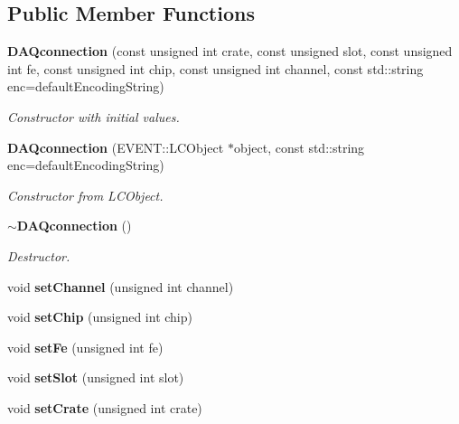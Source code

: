 \subsection*{Public Member Functions}
\begin{DoxyCompactItemize}
\item 
{\bf D\-A\-Qconnection} (const unsigned int crate, const unsigned slot, const unsigned int fe, const unsigned int chip, const unsigned int channel, const std\-::string enc=default\-Encoding\-String)\label{classCALICE_1_1DAQconnection_a1683f388c10013e8c435262de9c2b0a7}

\begin{DoxyCompactList}\small\item\em Constructor with initial values. \end{DoxyCompactList}\item 
{\bf D\-A\-Qconnection} (E\-V\-E\-N\-T\-::\-L\-C\-Object $\ast$object, const std\-::string enc=default\-Encoding\-String)\label{classCALICE_1_1DAQconnection_a7f6a1f3e76fe54b0f952cccf01b2b489}

\begin{DoxyCompactList}\small\item\em Constructor from L\-C\-Object. \end{DoxyCompactList}\item 
{\bf $\sim$\-D\-A\-Qconnection} ()\label{classCALICE_1_1DAQconnection_aab804c279b14b7139378825152f5d7af}

\begin{DoxyCompactList}\small\item\em Destructor. \end{DoxyCompactList}\item 
void {\bfseries set\-Channel} (unsigned int channel)\label{classCALICE_1_1DAQconnection_abc3d2a36439898873d04493ade4e2b79}

\item 
void {\bfseries set\-Chip} (unsigned int chip)\label{classCALICE_1_1DAQconnection_aa8749c6e343d3703cfd036a8a19851c8}

\item 
void {\bfseries set\-Fe} (unsigned int fe)\label{classCALICE_1_1DAQconnection_abbdb39c30e0d4c1709dc016fabbefabf}

\item 
void {\bfseries set\-Slot} (unsigned int slot)\label{classCALICE_1_1DAQconnection_a63a06aa5dda5881a3f19135cd5e42bf5}

\item 
void {\bfseries set\-Crate} (unsigned int crate)\label{classCALICE_1_1DAQconnection_aab13f456fa1e0f793b09820c82d9ada9}


\end{DoxyCompactItemize}
